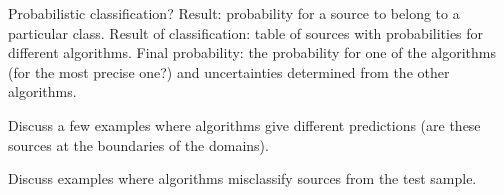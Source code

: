 Probabilistic classification? Result: probability for a source to belong to a particular class.
Result of classification: table of sources with probabilities for different algorithms.
Final probability: the probability for one of the algorithms (for the most precise one?) and uncertainties determined from the other algorithms.

Discuss a few examples where algorithms give different predictions (are these sources at the boundaries of the domains).

Discuss examples where algorithms misclassify sources from the test sample.




